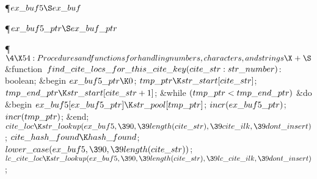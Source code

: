 \Y\P\D {}$\\{ex\_buf5}\S\\{ex\_buf}$\par
\P\D {}$\\{ex\_buf5\_ptr}\S\\{ex\_buf\_ptr}$\par
\Y\P$\4\X54:Procedures and functions for handling numbers, characters, and
strings\X\mathrel{+}\S$\6
\4\&{function}\1\  $\\{find\_cite\_locs\_for\_this\_cite\_key}(\\{cite%
\_str}:\\{str\_number})$: \\{boolean};\2\6
\&{begin} $\\{ex\_buf5\_ptr}\K0$;\5
$\\{tmp\_ptr}\K\\{str\_start}[\\{cite\_str}]$;\5
$\\{tmp\_end\_ptr}\K\\{str\_start}[\\{cite\_str}+1]$;\6
\&{while} $(\\{tmp\_ptr}<\\{tmp\_end\_ptr})$ \1\&{do}\6
\&{begin} $\\{ex\_buf5}[\\{ex\_buf5\_ptr}]\K\\{str\_pool}[\\{tmp\_ptr}]$;\5
$\\{incr}(\\{ex\_buf5\_ptr})$;\5
$\\{incr}(\\{tmp\_ptr})$;\6
\&{end};\2\6
$\\{cite\_loc}\K\\{str\_lookup}(\\{ex\_buf5},\390,\39\\{length}(\\{cite\_str}),%
\39\\{cite\_ilk},\39\\{dont\_insert})$;\5
$\\{cite\_hash\_found}\K\\{hash\_found}$;\5
$\\{lower\_case}(\\{ex\_buf5},\390,\39\\{length}(\\{cite\_str}))$;\6
$\\{lc\_cite\_loc}\K\\{str\_lookup}(\\{ex\_buf5},\390,\39\\{length}(\\{cite%
\_str}),\39\\{lc\_cite\_ilk},\39\\{dont\_insert})$;\6
